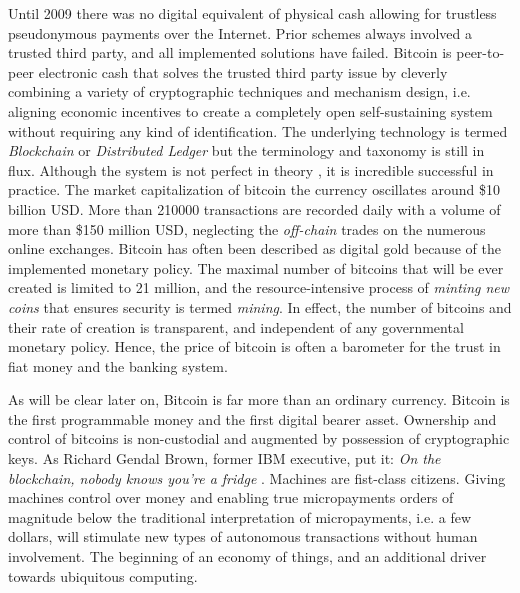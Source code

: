 Until 2009 there was no digital equivalent of physical cash allowing for trustless pseudonymous payments over the Internet. Prior schemes always involved a trusted third party, and all implemented solutions have failed. Bitcoin is peer-to-peer electronic cash \parencite{nakamoto2008bitcoin} that solves the trusted third party issue by cleverly combining a variety of cryptographic techniques and mechanism design, i.e. aligning economic incentives to create a completely open self-sustaining system without requiring any kind of identification. The underlying technology is termed \emph{Blockchain} or \emph{Distributed Ledger} but the terminology and taxonomy is still in flux. Although the system is not perfect in theory \parencite{Eyal2014}, it is incredible successful in practice. The market capitalization of bitcoin the currency oscillates around \$10 billion USD. More than 210000 transactions are recorded daily with a volume of more than \$150 million USD, neglecting the \emph{off-chain} trades on the numerous online exchanges. Bitcoin has often been described as digital gold because of the implemented monetary policy. The maximal number of bitcoins that will be ever created is limited to 21 million, and the resource-intensive process of \emph{minting new coins} that ensures security is termed \emph{mining}. In effect, the number of bitcoins and their rate of creation is transparent, and independent of any governmental monetary policy. Hence, the price of bitcoin is often a barometer for the trust in fiat money and the banking system.

As will be clear later on, Bitcoin is far more than an ordinary currency. Bitcoin is the first programmable money and the first digital bearer asset. Ownership and control of bitcoins is non-custodial and augmented by possession of cryptographic keys. As Richard Gendal Brown, former IBM executive, put it: \emph{On the blockchain, nobody knows you're a fridge} \parencite{brown2013}. Machines are fist-class citizens. Giving machines control over money and enabling true micropayments orders of magnitude below the traditional interpretation of micropayments, i.e. a few dollars, will stimulate new types of autonomous transactions without human involvement. The beginning of an economy of things, and an additional driver towards ubiquitous computing.

